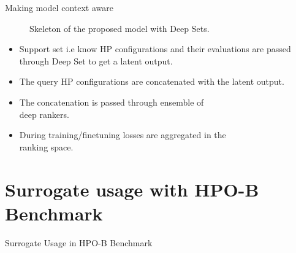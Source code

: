 \documentclass{beamer}
\begin{document}
\begin{frame}[t]{Making model context aware}
\begin{figure}[htb]
\begin{tikzpicture}
\end{tikzpicture}
\caption{Skeleton of the proposed model with Deep Sets.}
\label{fig:proposeModelDeepSets}
\end{figure}

\begin{itemize}
\item Support set i.e know HP configurations and their evaluations are passed through Deep Set to get a latent output.
\item The query HP configurations are concatenated with the latent output.
\item The concatenation is passed through ensemble of \\
deep rankers.
\item During training/finetuning losses are aggregated in the\\
 ranking space.
\end{itemize}

\end{frame}

\section{Surrogate usage with HPO-B Benchmark}
\begin{frame}

\centering
\LARGE{Surrogate Usage in HPO-B Benchmark}

\end{frame}
\end{document}
